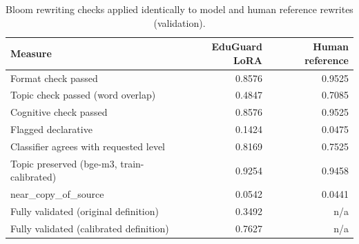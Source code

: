 \begin{table}[t]
\centering
\caption{Bloom rewriting checks applied identically to model and human reference rewrites (validation).}
\label{tab:t7_bloom_model_vs_reference}
\begin{tabular}{lrr}
\toprule
Measure & EduGuard LoRA & Human reference \\
\midrule
Format check passed & 0.8576 & 0.9525 \\
Topic check passed (word overlap) & 0.4847 & 0.7085 \\
Cognitive check passed & 0.8576 & 0.9525 \\
Flagged declarative & 0.1424 & 0.0475 \\
Classifier agrees with requested level & 0.8169 & 0.7525 \\
Topic preserved (bge-m3, train-calibrated) & 0.9254 & 0.9458 \\
near\_copy\_of\_source & 0.0542 & 0.0441 \\
Fully validated (original definition) & 0.3492 & n/a \\
Fully validated (calibrated definition) & 0.7627 & n/a \\
\bottomrule
\end{tabular}
\end{table}
